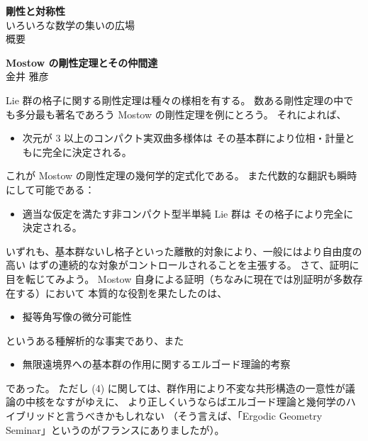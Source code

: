 \documentclass[uplatex,dvipdfmx]{jlreq}
\begin{document}
\begin{center}
  \vspace*{20pt}
  {\Huge\bfseries 剛性と対称性}\\[30pt]
  {\large いろいろな数学の集いの広場}\\[20pt]
  {\large 概要}
\end{center}

\vfill

\newpage

\begin{center}
  {\large\bfseries Mostow の剛性定理とその仲間達}\\[4pt]
  金井 雅彦
\end{center}

\medskip

Lie 群の格子に関する剛性定理は種々の様相を有する。
数ある剛性定理の中でも多分最も著名であろう Mostow の剛性定理を例にとろう。
それによれば、
\begin{itemize}
  \item[(1)] 次元が 3 以上のコンパクト実双曲多様体は
             その基本群により位相・計量ともに完全に決定される。
\end{itemize}
これが Mostow の剛性定理の幾何学的定式化である。
また代数的な翻訳も瞬時にして可能である：
\begin{itemize}
  \item[(2)] 適当な仮定を満たす非コンパクト型半単純 Lie 群は
             その格子により完全に決定される。
\end{itemize}
いずれも、基本群ないし格子といった離散的対象により、一般にはより自由度の高い
はずの連続的な対象がコントロールされることを主張する。
さて、証明に目を転じてみよう。
Mostow 自身による証明（ちなみに現在では別証明が多数存在する）において
本質的な役割を果たしたのは、
\begin{itemize}
  \item[(3)] 擬等角写像の微分可能性
\end{itemize}
というある種解析的な事実であり、また
\begin{itemize}
  \item[(4)] 無限遠境界への基本群の作用に関するエルゴード理論的考察
\end{itemize}
であった。
ただし (4) に関しては、群作用により不変な共形構造の一意性が議論の中核をなすがゆえに、
より正しくいうならばエルゴード理論と幾何学のハイブリッドと言うべきかもしれない
（そう言えば、「Ergodic Geometry Seminar」というのがフランスにありましたが）。
\end{document}
